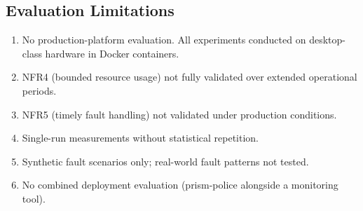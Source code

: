 \subsection*{Evaluation Limitations}

\begin{enumerate}
\item No production-platform evaluation. All experiments conducted on desktop-class hardware in Docker containers.
\item NFR4 (bounded resource usage) not fully validated over extended operational periods.
\item NFR5 (timely fault handling) not validated under production conditions.
\item Single-run measurements without statistical repetition.
\item Synthetic fault scenarios only; real-world fault patterns not tested.
\item No combined deployment evaluation (prism-police alongside a monitoring tool).
\end{enumerate}
